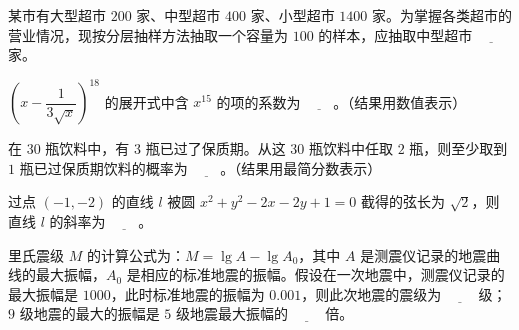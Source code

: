 \begin{question}
某市有大型超市 $200$ 家、中型超市 $400$ 家、小型超市 $1400$ 家。为掌握各类超市的营业情况，现按分层抽样方法抽取一个容量为 $100$ 的样本，应抽取中型超市 $\underline{\qquad}$ 家。

\end{question}
\begin{question}
$\left(x-\dfrac1{3\sqrt x}\right)^{18}$ 的展开式中含 $x^{15}$ 的项的系数为 $\underline{\qquad}$。（结果用数值表示）

\end{question}
\begin{question}
在 $30$ 瓶饮料中，有 $3$ 瓶已过了保质期。从这 $30$ 瓶饮料中任取 $2$ 瓶，则至少取到 $1$ 瓶已过保质期饮料的概率为 $\underline{\qquad}$。（结果用最简分数表示）

\end{question}
\begin{question}
过点 $(-1,-2)$ 的直线 $l$ 被圆 $x^2+y^2-2x-2y+1=0$ 截得的弦长为 $\sqrt2$，则直线 $l$ 的斜率为 $\underline{\qquad}$。

\end{question}
\begin{question}
里氏震级 $M$ 的计算公式为：$M=\lg A-\lg A_0$，其中 $A$ 是测震仪记录的地震曲线的最大振幅，$A_0$ 是相应的标准地震的振幅。假设在一次地震中，测震仪记录的最大振幅是 $1000$，此时标准地震的振幅为 $0.001$，则此次地震的震级为 $\underline{\qquad}$ 级；$9$ 级地震的最大的振幅是 $5$ 级地震最大振幅的 $\underline{\qquad}$ 倍。

\end{question}

